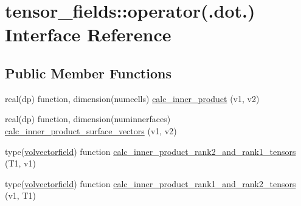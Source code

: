 \hypertarget{interfacetensor__fields_1_1operator_07_8dot_8_08}{\section{tensor\-\_\-fields\-:\-:operator(.dot.) Interface Reference}
\label{interfacetensor__fields_1_1operator_07_8dot_8_08}
}
\subsection*{Public Member Functions}
\begin{DoxyCompactItemize}
\item 
real(dp) function, dimension(numcells) \hyperlink{interfacetensor__fields_1_1operator_07_8dot_8_08_a838256bff6e171fd3b62f4c1badd5ae1}{calc\-\_\-inner\-\_\-product} (v1, v2)
\item 
real(dp) function, dimension(numinnerfaces) \hyperlink{interfacetensor__fields_1_1operator_07_8dot_8_08_abae545e81e54059c0086d53b7172a7fc}{calc\-\_\-inner\-\_\-product\-\_\-surface\-\_\-vectors} (v1, v2)
\item 
type(\hyperlink{structtensor__fields_1_1volvectorfield}{volvectorfield}) function \hyperlink{interfacetensor__fields_1_1operator_07_8dot_8_08_a434df252f10aa77828f94376cd0c77ef}{calc\-\_\-inner\-\_\-product\-\_\-rank2\-\_\-and\-\_\-rank1\-\_\-tensors} (T1, v1)
\item 
type(\hyperlink{structtensor__fields_1_1volvectorfield}{volvectorfield}) function \hyperlink{interfacetensor__fields_1_1operator_07_8dot_8_08_a637050f8d6286c96c2a9091b07e2432d}{calc\-\_\-inner\-\_\-product\-\_\-rank1\-\_\-and\-\_\-rank2\-\_\-tensors} (v1, T1)
\end{DoxyCompactItemize}


